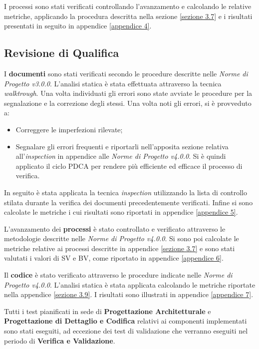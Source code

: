 \noindent I processi sono stati verificati controllando l'avanzamento e calcolando le relative metriche, applicando la procedura descritta nella sezione \ref{sezione 3.7} e i risultati presentati in seguito in appendice \ref{appendice 4}.

\subsection{Revisione di Qualifica}

I \textbf{documenti} sono stati verificati secondo le procedure descritte nelle \textit{Norme di Progetto v3.0.0}. L'analisi statica è stata effettuata attraverso la tecnica \textit{walktrough}. Una volta individuati gli errori sono state avviate le procedure per la segnalazione e la correzione degli stessi. Una volta noti gli errori, si è provveduto a:
\begin{itemize}
	\item Correggere le imperfezioni rilevate;
	\item Segnalare gli errori frequenti e riportarli nell'apposita sezione relativa all'\textit{inspection} in appendice alle \textit{Norme di Progetto v4.0.0}. Si è quindi applicato il ciclo PDCA per rendere più efficiente ed efficace il processo di verifica.
\end{itemize}

\noindent In seguito è stata applicata la tecnica \textit{inspection} utilizzando la lista di controllo stilata durante la verifica dei documenti precedentemente verificati. Infine si sono calcolate le metriche i cui risultati sono riportati in appendice \ref{appendice 5}.

\noindent L'avanzamento dei \textbf{processi} è stato controllato e verificato attraverso le metodologie descritte nelle \textit{Norme di Progetto v4.0.0}. Si sono poi calcolate le metriche relative ai processi descritte in appendice \ref{sezione 3.7} e sono stati valutati i valori di SV e BV, come riportato in appendice \ref{appendice 6}.

\noindent Il \textbf{codice} è stato verificato attraverso le procedure indicate nelle \textit{Norme di Progetto v4.0.0}. L'analisi statica è stata applicata calcolando le metriche riportate nella appendice \ref{sezione 3.9}. I risultati sono illustrati in appendice \ref{appendice 7}.

\noindent Tutti i test pianificati in sede di \textbf{Progettazione Architetturale} e \textbf{Progettazione di Dettaglio e Codifica} relativi ai componenti implementati sono stati eseguiti, ad eccezione dei test di validazione che verranno eseguiti nel periodo di \textbf{Verifica e Validazione}.